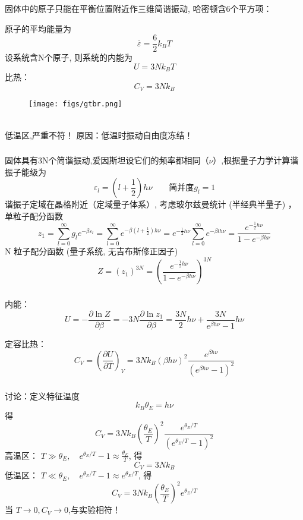 \begin{frame}
  \frametitle{}
  \解 固体中的原子只能在平衡位置附近作三维简谐振动, 哈密顿含6个平方项： 
  \begin{minipage}[b]{0.49\textwidth}
    原子的平均能量为
    \[ \overline{\varepsilon }  = \frac{6}{2}k_BT\]
    设系统含N个原子, 则系统的内能为
    \[ U= 3 N k_BT\]
    比热： 
    \[ C_V = 3 N k_B\] 
    \end{minipage} 
  \begin{minipage}[b]{0.49\textwidth}
    \begin{figure}[htbp]
      \centering
      \texttt{[image: figs/gtbr.png]}
     \end{figure}
    \end{minipage}

    ~~\\
    低温区,严重不符！ 原因：低温时振动自由度冻结！
\end{frame} 

\begin{frame}
  \frametitle{}
  \解 固体具有3N个简谐振动,爱因斯坦设它们的频率都相同（$\nu$）,根据量子力学计算谐振子能级为
  \[\varepsilon _l = (l+ \frac{1}{2}) h \nu \qquad \text{简并度} g_l =1\]
  谐振子定域在晶格附近（定域量子体系）, 考虑玻尔兹曼统计 (半经典半量子) ，单粒子配分函数
  \[ z_1 = \sum_{l=0}^\infty g_l e^{-\beta \varepsilon_l} = \sum_{l=0}^\infty e^{-\beta (l+ \frac{1}{2}) h \nu} = e^{-\frac{1}{2}h \nu} \sum_{l=0}^\infty e^{-\beta l h \nu} = \frac{e^{-\frac{1}{2}h \nu}}{1- e^{-\beta h \nu}}\]
  N 粒子配分函数 (量子系统, 无吉布斯修正因子)
  \[ Z = (z_1)^{3N} = \left(\frac{e^{-\frac{1}{2}h \nu}}{1- e^{-\beta h \nu}}\right)^{3N}\]
\end{frame} 

\begin{frame}
  \frametitle{}
  内能：
  \[ U = -\frac{\partial \ln Z}{\partial \beta } = -3N \frac{\partial \ln z_1}{\partial \beta } = \frac{3N}{2} h \nu + \frac{3N}{e^{\beta h \nu} -1 } h \nu \] 

  定容比热： 
  \[ C_V = \left(\frac{\partial U}{\partial T }\right)_V = 3N k_B  (\beta h \nu)^2 \frac{e^{\beta h \nu}}{\left( e^{\beta h \nu} -1 \right)^2} \]
\end{frame} 

\begin{frame}
  \frametitle{}
讨论：定义特征温度 
\[ k_B \theta _E  = h \nu \]
得
\[ C_V = 3N k_B  (\frac{\theta _E}{T})^2 \frac{e^{\theta _E / T}}{\left( e^{\theta _E / T} -1 \right)^2} \]
高温区： $T\gg \theta _E, \quad e^{\theta _E / T} -1 \approx  \frac{\theta _E}{T} $, 得
\[ C_V = 3N k_B \] 
低温区： $T\ll \theta _E, \quad e^{\theta _E / T} -1 \approx  e^{\theta _E / T} $, 得
\[ C_V = 3N k_B  (\frac{\theta _E}{T})^2 e^{\theta _E / T} \]  
当 $T \to 0, C_V \to 0$,与实验相符！ 
\end{frame} 


